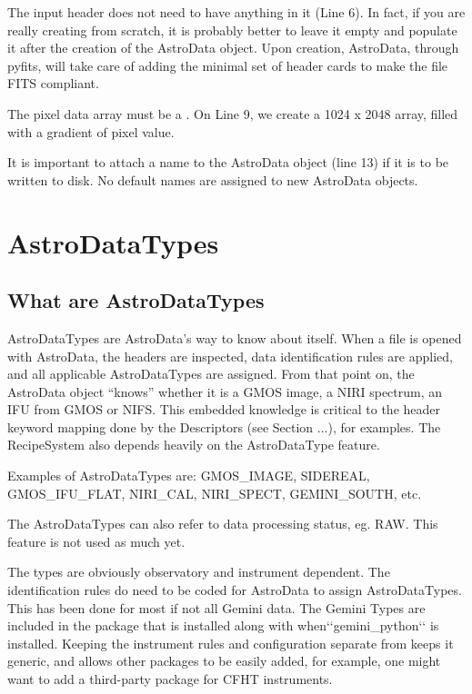\documentclass[letterpaper,10pt,english]{sphinxmanual}
\begin{document}
The input header does not need to have anything in it (Line 6).  In fact, if
you are really creating from scratch, it is probably better to leave it empty
and populate it after the creation of the AstroData object.  Upon creation,
AstroData, through pyfits, will take care of adding the minimal set of header
cards to make the file FITS compliant.

The pixel data array must be a .  On Line 9, we create a
1024 x 2048 array, filled with a gradient of pixel value.

It is important to attach a name to the AstroData object (line 13) if it is to
be written to disk.  No default names are assigned to new AstroData objects.


\chapter{AstroDataTypes}
\label{types:astrodatatypes}\label{types::doc}\label{types:types}

\section{What are AstroDataTypes}
\label{types:what-are-astrodatatypes}
AstroDataTypes are AstroData's way to know about itself.  When a file is
opened with AstroData, the headers are inspected, data identification rules
are applied, and all applicable AstroDataTypes are assigned.  From that point
on, the AstroData object ``knows'' whether it is a GMOS image, a NIRI spectrum,
an IFU from GMOS or NIFS. This embedded knowledge is critical to the header
keyword mapping done by the Descriptors (see Section ...), for examples.
The RecipeSystem also depends heavily on the AstroDataType feature.

Examples of AstroDataTypes are: GMOS\_IMAGE, SIDEREAL, GMOS\_IFU\_FLAT, NIRI\_CAL,
NIRI\_SPECT, GEMINI\_SOUTH, etc.

The AstroDataTypes can also refer to data processing status, eg. RAW.  This
feature is not used as much yet.

The types are obviously observatory and instrument dependent.  The
identification rules do need to be coded for AstroData to assign
AstroDataTypes.  This has been done for most if not all Gemini data.  The
Gemini Types are included in the  package that is
installed along with  when{}`{}`gemini\_python{}`{}` is installed.
Keeping the instrument rules and configuration separate from 
keeps it generic, and allows other packages to be easily added, for example,
one might want to add a third-party package for CFHT instruments.
\end{document}
